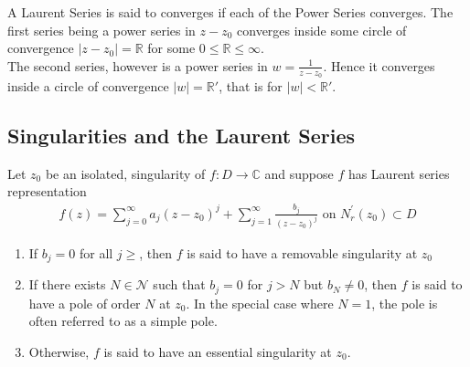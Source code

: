 \documentclass[11pt]{report}
\newcommand{\sprime}{'}
\newcommand{\dsp}{\displaystyle}
\newcommand{\NI}{\noindent}
\newcommand{\real}{ \mathbb{R}}
\newcommand{\complex}{\mathbb{C}}
\begin{document}
	\NI A Laurent Series is said to converges if each of the Power Series converges. The first series being a power series in $z-z_0$ converges inside some circle of convergence $|z-z_0|=\real$ for some $0\leq \real \leq \infty$.\\
	The second series, however is a power series in $\dsp w = \frac{1}{z-z_0}$. Hence it converges inside a circle of convergence $|w|=\real\sprime$, that is for $|w|<\real\sprime$.

	\subsection{Singularities and the Laurent Series}
	Let $z_0$ be an isolated, singularity of $f:D\rightarrow\complex$ and suppose $f$ has Laurent series representation
	\begin{eqnarray}
		f(z) = \sum_{j=0}^{\infty}a_j(z-z_0)^j + \sum_{j=1}^{\infty}\frac{b_j}{(z-z_0)^j} \text{ on } N_r^{\sprime}(z_0) \subset D
	\end{eqnarray}
	
	\begin{enumerate}
		\item If $b_j=0$ for all $j\geq $, then $f$ is said to have a removable singularity at $z_0$
		\item If there exists $N\in\mathcal{N}$ such that $b_j=0$ for $j>N$ but $b_N\neq 0 $, then $f$ is said to have a pole of order $N$ at $z_0$. In the special case where $N=1$, the pole is often referred to as a simple pole.
		\item Otherwise, $f$ is said to have an essential singularity at $z_0$. 
	\end{enumerate}
	
\end{document}
